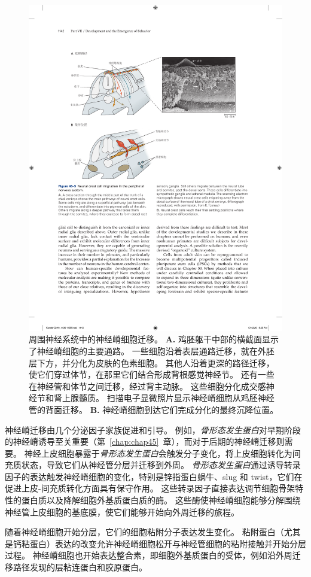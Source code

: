\begin{figure}[htbp]
	\centering
	\includegraphics[width=0.8\linewidth]{chap46/fig_46_9}
	\caption{周围神经系统中的神经嵴细胞迁移。
		\textbf{A.} 鸡胚躯干中部的横截面显示了神经嵴细胞的主要通路。
		一些细胞沿着表层通路迁移，就在外胚层下方，并分化为皮肤的色素细胞。
		其他人沿着更深的路径迁移，使它们穿过体节，在那里它们结合形成背根感觉神经节。
		还有一些在神经管和体节之间迁移，经过背主动脉。
		这些细胞分化成交感神经节和肾上腺髓质。
		扫描电子显微照片显示神经嵴细胞从鸡胚神经管的背面迁移。
		\textbf{B.} 神经嵴细胞到达它们完成分化的最终沉降位置。}
	\label{fig:46_9}
\end{figure}


神经嵴迁移由几个分泌因子家族促进和引导。
例如，\textit{骨形态发生蛋白}对早期阶段的神经嵴诱导至关重要（第~\ref{chap:chap45}~章），而对于后期的神经嵴迁移则需要。
神经上皮细胞暴露于\textit{骨形态发生蛋白}会触发分子变化，将上皮细胞转化为间充质状态，导致它们从神经管分层并迁移到外周。
\textit{骨形态发生蛋白}通过诱导转录因子的表达触发神经嵴细胞的变化，特别是锌指蛋白蜗牛、slug 和 twist，它们在促进上皮-间充质转化方面具有保守作用。
这些转录因子直接表达调节细胞骨架特性的蛋白质以及降解细胞外基质蛋白质的酶。
这些酶使神经嵴细胞能够分解围绕神经管上皮细胞的基底膜，使它们能够开始向外周迁移的旅程。


随着神经嵴细胞开始分层，它们的细胞粘附分子表达发生变化。
粘附蛋白（尤其是钙粘蛋白）表达的改变允许神经嵴细胞松开与神经管细胞的粘附接触并开始分层过程。
神经嵴细胞也开始表达整合素，即细胞外基质蛋白的受体，例如沿外周迁移路径发现的层粘连蛋白和胶原蛋白。


